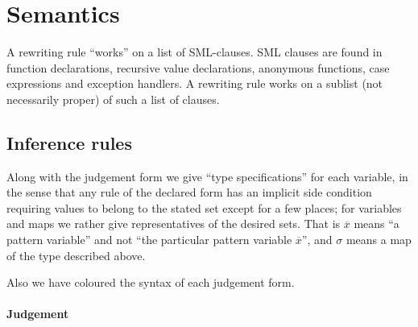 
\section{Semantics}
A rewriting rule ``works'' on a list of SML-clauses. SML clauses are found in
function declarations, recursive value declarations, anonymous functions, case
expressions and exception handlers. A rewriting rule works on a sublist (not
necessarily proper) of such a list of clauses.


\subsection{Inference rules}
\def\TheTrueColour{BrickRed}

\newcommand{\cc}[1]{{\color{\TheTrueColour}#1}}
\newcommand{\subspat}[3]{\ensuremath{#1\cc{(}#2\cc{)}\mathrel{\cc{=}}#3}}
\newcommand{\matchpat}[3]{\ensuremath{\cc{{\color{Black}#1}\mathrel{:}\left\langle{\color{Black}#2},\mathrel{ }{\color{Black}#3}\right\rangle}}}
\newcommand{\matchbody}[4]{\ensuremath{#1\cc{,}\mathrel{ }#2\mathrel{\cc{|-}}#3\mathrel{\cc{:}}#4}}
\newcommand{\matchclause}[3]{\ensuremath{#1\mathrel{\cc{|-}}#2\mathrel{\cc{:}}#3}}
\newcommand{\rewrite}[4]{\ensuremath{#1\mathrel{\cc{,}}#2\mathrel{\cc{|-}}#3\mathrel{\cc{\curvearrowright}}#4}}
\newcommand{\becomesthrough}[3]{\ensuremath{#1\mathrel{\textsf{\cc{becomes}}}#2\mathrel{\textsf{\cc{through}}}#3}}

Along with the judgement form we give ``type specifications'' for each variable,
in the sense that any rule of the declared form has an implicit side condition
requiring values to belong to the stated set except for a few places; for
variables and maps we rather give representatives of the desired sets. That is
$\overline{x}$ means ``a pattern variable'' and not ``the particular pattern
variable $\overline{x}$'', and $\sigma$ means a map of the type described above.

Also we have \cc{coloured} the syntax of each judgement form.

\paragraph{Judgement} \fbox{\subspat{\sigma}{spat}{mpat}} \\

